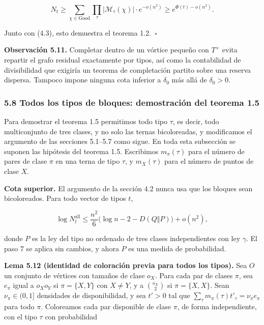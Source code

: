 \documentclass[spanish,11pt,a4paper]{article}
\begin{document}
\nopagebreak[4]
\[N_t\ge\sum_{\chi\in\mathrm{Good}}\prod_\tau|\mathcal M_\tau(\chi)|\cdot e^{-o(n^2)}\ge e^{\Phi(t)-o(n^2)}.\]

Junto con (4.3), esto demuestra el teorema 1.2.~\(\square\)

\textbf{Observación 5.11.} Completar dentro de un vórtice pequeño con \(T^+\) evita repartir el grafo residual exactamente por tipos, así como la contabilidad de divisibilidad que exigiría un teorema de completación partito sobre una reserva dispersa. Tampoco impone ninguna cota inferior a \(\delta_0\) más allá de \(\delta_0>0\).

\subsubsection{5.8 Todos los tipos de bloques: demostración del teorema 1.5}\label{todos-los-tipos-de-bloques-demostraciuxf3n-del-teorema-1.5}

Para demostrar el teorema 1.5 permitimos todo tipo \(\tau\), es decir, todo multiconjunto de tres clases, y no solo las ternas bicoloreadas, y modificamos el argumento de las secciones 5.1--5.7 como sigue. En toda esta subsección se suponen las hipótesis del teorema 1.5. Escribimos \(m_\pi(\tau)\) para el número de pares de clase \(\pi\) en una terna de tipo \(\tau\), y \(m_X(\tau)\) para el número de puntos de clase \(X\).

\textbf{Cota superior.} El argumento de la sección 4.2 nunca usa que los bloques sean bicoloreados. Para todo vector de tipos \(t\),

\nopagebreak[4]
\[\log N^{\mathrm{all}}_t\le\frac{n^2}{6}\bigl(\log n-2-D(Q\Vert P)\bigr)+o(n^2),
\tag{5.2}\]

donde \(P\) es la ley del tipo no ordenado de tres clases independientes con ley \(\gamma\). El paso 7 se aplica sin cambios, y ahora \(P\) es una medida de probabilidad.

\textbf{Lema 5.12 (identidad de coloración previa para todos los tipos).} Sea \(O\) un conjunto de vértices con tamaños de clase \(o_X\). Para cada par de clases \(\pi\), sea \(e_\pi\) igual a \(o_Xo_Y\) si \(\pi=\{X,Y\}\) con \(X\ne Y\), y a \(\binom{o_X}{2}\) si \(\pi=\{X,X\}\). Sean \(\nu_\pi\in(0,1]\) densidades de disponibilidad, y sea \(t'>0\) tal que \(\sum_\tau m_\pi(\tau)t'_\tau=\nu_\pi e_\pi\) para todo \(\pi\). Coloreamos cada par disponible de clase \(\pi\), de forma independiente, con el tipo \(\tau\) con probabilidad
\end{document}
